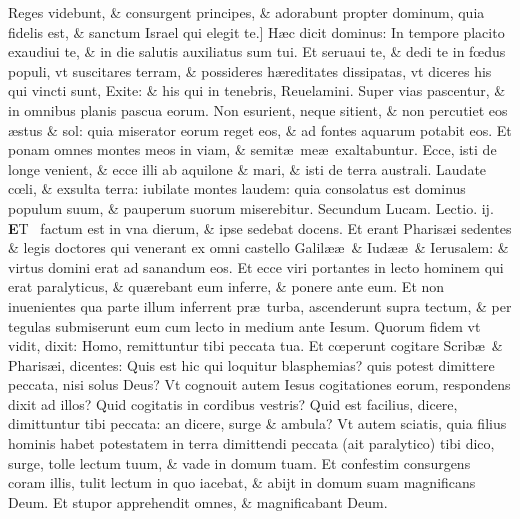 \documentclass[a5paper,10pt]{book}
\def\leftmarginnote{%
	\lrmarginnote{\hskip -\marginparsep \hskip -6.5em}}
\def\ae{æ}
\def\oe{œ}
\begin{document}
\begin{multicols*}{2}
Reges videbunt, \& consurgent principes, \& adorabunt propter dominum, quia fidelis est, \& sanctum Israel qui elegit te.]
H\ae c\leftmarginnote{\begin{flushright}B\end{flushright}} dicit dominus: In tempore placito exaudiui te, \& in die salutis auxiliatus sum tui.
Et seruaui te, \& dedi te in f\oe dus populi, vt suscitares terram, \& possideres h\ae reditates dissipatas, vt diceres his qui vincti sunt, Exite: \& his qui in tenebris, Reuelamini.
Super vias pascentur, \& in omnibus planis pascua eorum.
Non esurient, neque sitient, \& non percutiet eos \ae stus \& sol: quia miserator eorum reget eos, \& ad fontes aquarum potabit eos.
Et ponam omnes montes meos in viam, \& semit\ae \ me\ae \ exaltabuntur.
Ecce, isti de longe venient, \& ecce illi ab aquilone \& mari, \& isti de terra australi.
Laudate c\oe li, \& exsulta terra: iubilate montes laudem: quia consolatus est dominus populum suum, \& pauperum suorum miserebitur.
\fancyhead[C]{\color{red} Feria. v. Dominic\ae . ij. aduentus}
\newline \color{red} Secundum Lucam. \hfill Lectio. ij. \color{black}
\vspace{-.25em}
\lettrine[lines=2]{\bfseries \color{red} E}{}T \textdagger \ factum\leftmarginnote{\begin{flushright}c.5.c\end{flushright}} est in vna dierum, \& ipse sedebat docens.
Et erant Pharis\ae i sedentes \& legis doctores qui venerant ex omni castello Galil\ae \ae \ \& Iud\ae \ae \ \& Ierusalem: \& virtus domini erat ad sanandum eos.
Et ecce viri portantes in lecto hominem qui
erat paralyticus, \& qu\ae rebant eum inferre, \& ponere ante eum.
Et non inuenientes qua parte illum inferrent pr\ae \ turba, ascenderunt supra tectum, \& per tegulas submiserunt eum cum lecto in medium ante Iesum.
Quorum fidem vt vidit, dixit: Homo, remittuntur tibi peccata tua.
Et c\oe perunt cogitare Scrib\ae \ \& Pharis\ae i, dicentes: Quis est hic qui loquitur blasphemias? quis potest dimittere peccata, nisi solus Deus?
Vt cognouit autem Iesus cogitationes eorum, respondens dixit ad illos? Quid cogitatis in cordibus vestris?
Quid est facilius, dicere, dimittuntur tibi peccata: an dicere, surge \& ambula?
Vt autem sciatis, quia filius hominis habet potestatem in terra dimittendi peccata (ait paralytico) tibi dico, surge, tolle lectum tuum, \& vade in domum tuam.
Et confestim consurgens coram illis, tulit lectum in quo iacebat, \& abijt in domum suam magnificans Deum.
Et stupor apprehendit omnes, \& magnificabant Deum.

\end{multicols*}
\end{document}
